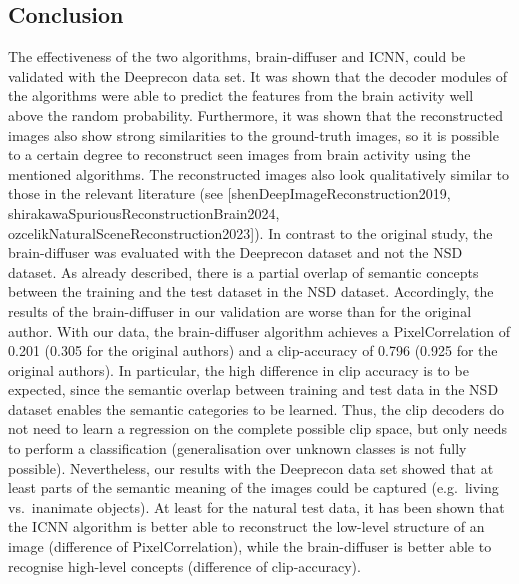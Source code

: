 \subsection{Conclusion}
The effectiveness of the two algorithms, brain-diffuser and ICNN, could be validated with the Deeprecon data set. It was shown that the decoder modules of the algorithms were able to predict the features from the brain activity well above the random probability. Furthermore, it was shown that the reconstructed images also show strong similarities to the ground-truth images, so it is possible to a certain degree to reconstruct seen images from brain activity using the mentioned algorithms. The reconstructed images also look qualitatively similar to those in the relevant literature (see [shenDeepImageReconstruction2019, shirakawaSpuriousReconstructionBrain2024, ozcelikNaturalSceneReconstruction2023]).
In contrast to the original study, the brain-diffuser was evaluated with the Deeprecon dataset and not the NSD dataset. As already described, there is a partial overlap of semantic concepts between the training and the test dataset in the NSD dataset. Accordingly, the results of the brain-diffuser in our validation are worse than for the original author\cite{ozcelikNaturalSceneReconstruction2023}. With our data, the brain-diffuser algorithm achieves a PixelCorrelation of 0.201 (0.305 for the original authors) and a clip-accuracy of 0.796 (0.925 for the original authors). In particular, the high difference in clip accuracy is to be expected, since the semantic overlap between training and test data in the NSD dataset enables the semantic categories to be learned. Thus, the clip decoders do not need to learn a regression on the complete possible clip space, but only needs to perform a classification (generalisation over unknown classes is not fully possible). 
Nevertheless, our results with the Deeprecon data set showed that at least parts of the semantic meaning of the images could be captured (e.g.\ living vs.\ inanimate objects). At least for the natural test data, it has been shown that the ICNN algorithm is better able to reconstruct the low-level structure of an image (difference of PixelCorrelation), while the brain-diffuser is better able to recognise high-level concepts (difference of clip-accuracy). 
